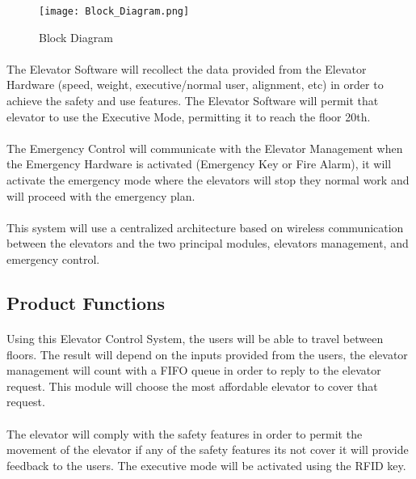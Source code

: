 \documentclass[12pt]{article}
\begin{document}
		\begin{figure}[h!]
  			\centerline{\texttt{[image: Block\_Diagram.png]}}
  			\caption{Block Diagram}
  			\label{fig:block}
		\end{figure}
		
		\paragraph{} The Elevator Software will recollect the data provided from the Elevator 
		Hardware (speed, weight, executive/normal user, alignment, etc) in order to achieve the 
		safety and use features. The Elevator Software will permit that elevator to use the 
		Executive Mode, permitting it to reach the floor 20th.
		
		\paragraph{} The Emergency Control will communicate with the Elevator Management when 
		the Emergency Hardware is activated (Emergency Key or Fire Alarm), it will activate 
		the emergency mode where the elevators will stop they normal work and will proceed 
		with the emergency plan.
		
		\paragraph{} This system will use a centralized architecture based on wireless communication 
		between the elevators and the two principal modules, elevators management, and emergency control.

	\subsection{Product Functions}
		\paragraph{} Using this Elevator Control System, the users will be able to travel between 
		floors. The result will depend on the inputs provided from the users, the elevator management 
		will count with a FIFO queue in order to reply to the elevator request. This module will 
		choose the most affordable elevator to cover that request.
		
		\paragraph{} The elevator will comply with the safety features in order to permit the 
		movement of the elevator if any of the safety features its not cover it will provide 
		feedback to the users. The executive mode will be activated using the RFID key.
		
\end{document}
